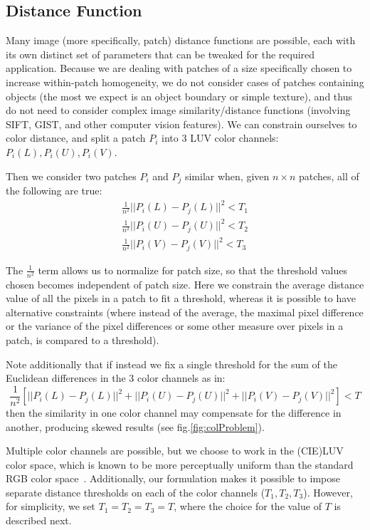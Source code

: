 \subsection{Distance Function}
\label{sec:simthresh}

Many image (more specifically, patch) distance functions are possible, each with its own distinct set of parameters that can be tweaked for the required application. Because we are dealing with patches of a size specifically chosen to increase within-patch homogeneity, we do not consider cases of patches containing objects (the most we expect is an object boundary or simple texture), and thus do not need to consider complex image similarity/distance functions (involving SIFT, GIST, and other computer vision features). We can constrain ourselves to color distance, and split a patch $P_i$ into 3 LUV color channels: $P_i(L), P_i(U), P_i(V)$. 

Then we consider two patches $P_i$ and $P_j$ similar when, given $n\times n$ patches, all of the following are true:
\begin{align*}
\frac{1}{n^2}||P_i(L) - P_j(L)||^2 < T_1 \\
\frac{1}{n^2}||P_i(U) - P_j(U)||^2 < T_2 \\
\frac{1}{n^2}||P_i(V) - P_j(V)||^2 < T_3
\end{align*}

The $\frac{1}{n^2}$ term allows us to normalize for patch size, so that the threshold values chosen becomes independent of patch size. Here we constrain the average distance value of all the pixels in a patch to fit a threshold, whereas it is possible to have alternative constraints (where instead of the average, the maximal pixel difference or the variance of the pixel differences or some other measure over pixels in a patch, is compared to a threshold).

Note additionally that if instead we fix a single threshold for the sum of the Euclidean differences in the 3 color channels as in: 
\begin{displaymath}
\frac{1}{n^2}[||P_i(L) - P_j(L)||^2 + ||P_i(U) - P_j(U)||^2 + ||P_i(V) - P_j(V)||^2] < T
\end{displaymath}
then the similarity in one color channel may compensate for the difference in another, producing skewed results (see fig.\ref{fig:colProblem}).

Multiple color channels are possible, but we choose to work in the (CIE)LUV color space, which is known to be more perceptually uniform than the standard RGB color space~\cite{kekre2012performance}. Additionally, our formulation makes it possible to impose separate distance thresholds on each of the color channels ($T_1,T_2,T_3$). However, for simplicity, we set $T_1=T_2=T_3=T$, where the choice for the value of $T$ is described next.

